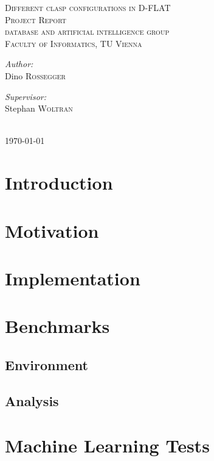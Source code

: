 

\begin{titlepage}
\center
\textsc{\LARGE{Different clasp configurations in D-FLAT}}\\[1.5cm]
\textsc{\large{Project Report}}\\[1cm]
\textsc{\large{database and artificial intelligence group}}\\
\textsc{\large{Faculty of Informatics, TU Vienna}}\\[1.5cm]
\begin{minipage}{0.4\textwidth}
	\begin{flushleft} \large
		\emph{Author:}\\
		Dino \textsc{Rossegger} %
	\end{flushleft}
\end{minipage}
\begin{minipage}{0.4\textwidth}
	\begin{flushright} \large
		\emph{Supervisor:} \\
		Stephan \textsc{Woltran} %
	\end{flushright}
\end{minipage}\\[4cm]
{\large \today}\\[2cm]
\end{titlepage}

\section{Introduction}
\section{Motivation}
\section{Implementation}
\label{sec:impl}

\section{Benchmarks}\label{sec:benchmarks}
\subsection{Environment}
\subsection{Analysis}
\section{Machine Learning Tests}



